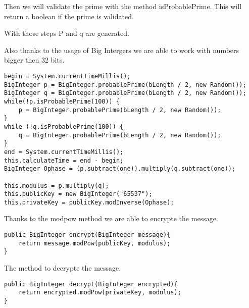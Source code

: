 Then we will validate the prime with the method isProbablePrime.
This will return a boolean if the prime is validated.

With those steps P and q are generated.

Also thanks to the usage of Big Intergers we are able to work with numbers bigger then 32 bits.

\begin{lstlisting}
begin = System.currentTimeMillis();
BigInteger p = BigInteger.probablePrime(bLength / 2, new Random());
BigInteger q = BigInteger.probablePrime(bLength / 2, new Random());
while(!p.isProbablePrime(100)) {
    p = BigInteger.probablePrime(bLength / 2, new Random());
}
while (!q.isProbablePrime(100)) {
    q = BigInteger.probablePrime(bLength / 2, new Random());
}
end = System.currentTimeMillis();
this.calculateTime = end - begin;
BigInteger Ophase = (p.subtract(one)).multiply(q.subtract(one));

this.modulus = p.multiply(q);
this.publicKey = new BigInteger("65537");
this.privateKey = publicKey.modInverse(Ophase);
\end{lstlisting}{}

Thanks to the modpow method we are able to encrypte the message.

\begin{lstlisting}
public BigInteger encrypt(BigInteger message){
    return message.modPow(publicKey, modulus);
}
\end{lstlisting}

The method to decrypte the message.

\begin{lstlisting}
public BigInteger decrypt(BigInteger encrypted){
    return encrypted.modPow(privateKey, modulus);
}
\end{lstlisting}

